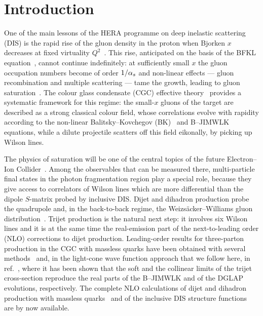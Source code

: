 \section{Introduction}
\label{sec:intro}

One of the main lessons of the HERA programme on deep inelastic scattering (DIS) is the rapid rise of
the gluon density in the proton when Bjorken $x$ decreases at fixed virtuality
$Q^2$~\cite{Aaron:2009aa,H1:2015ubc}. This rise, anticipated on the basis of the BFKL
equation~\cite{Lipatov:1976zz,Kuraev:1977fs,Balitsky:1978ic}, cannot continue indefinitely: at
sufficiently small $x$ the gluon occupation numbers become of order $1/\alpha_s$ and non-linear effects ---
gluon recombination and multiple scattering --- tame the growth, leading to gluon
saturation~\cite{Gribov:1984tu,Mueller:1985wy}. The colour glass condensate (CGC) effective
theory~\cite{McLerran:1993ni,McLerran:1993ka,Iancu:2002xk,Iancu:2003xm,Gelis:2010nm,Kovchegov:2012mbw}
provides a systematic framework for this regime: the small-$x$ gluons of the target are described as a
strong classical colour field, whose correlations evolve with rapidity according to the non-linear
Balitsky--Kovchegov (BK)~\cite{Balitsky:1995ub,Kovchegov:1999yj} and
B--JIMWLK~\cite{JalilianMarian:1997jx,JalilianMarian:1997gr,Kovner:2000pt,Weigert:2000gi,Iancu:2000hn,Iancu:2001ad,Ferreiro:2001qy}
equations, while a dilute projectile scatters off this field eikonally, by picking up Wilson lines.

The physics of saturation will be one of the central topics of the future Electron--Ion
Collider~\cite{Accardi:2012qut,AbdulKhalek:2021gbh}. Among the observables that can be measured there,
multi-particle final states in the photon fragmentation region play a special role, because they give
access to correlators of Wilson lines which are more differential than the dipole $S$-matrix probed
by inclusive DIS. Dijet and dihadron production probe the quadrupole and, in the back-to-back regime,
the Weizs\"{a}cker--Williams gluon
distribution~\cite{Gelis:2002nn,Dominguez:2011wm,Metz:2011wb,Dumitru:2015gaa,Mueller:2013wwa}. Trijet
production is the natural next step: it involves six Wilson lines and it is at the same time the
real-emission part of the next-to-leading order (NLO) corrections to dijet production. Leading-order
results for three-parton production in the CGC with massless quarks have been obtained with several
methods~\cite{Ayala:2016lhd,Ayala:2017rmh,Boussarie:2014lxa,Boussarie:2016ogo,Altinoluk:2020qet} and, in
the light-cone wave function approach that we follow here, in ref.~\cite{Iancu:2022gpw}, where it has
been shown that the soft and the collinear limits of the trijet cross-section reproduce the real parts
of the B--JIMWLK and of the DGLAP evolutions, respectively. The complete NLO calculations of dijet and
dihadron production with massless
quarks~\cite{Caucal:2021ent,Taels:2022tza,Bergabo:2022tcu,Caucal:2022ulg,Bergabo:2023wed} and of the
inclusive DIS structure functions~\cite{Balitsky:2010ze,Beuf:2016wdz,Beuf:2017bpd,Hanninen:2017ddy} are
by now available.

